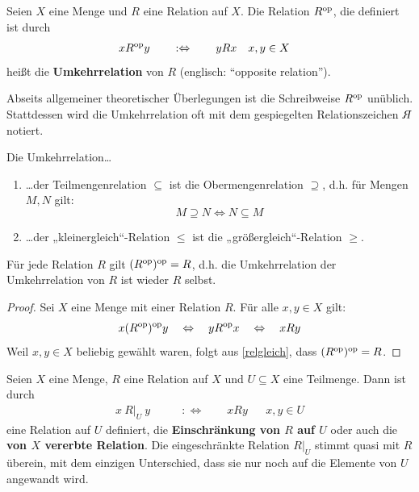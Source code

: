 \begin{defin}[Umkehrrelation] \label{def:umkehrrel} 
    Seien $X$ eine Menge und $R$ eine Relation auf $X$. Die Relation $R^{\mathrm{op}}$, die definiert ist durch
    \begin{align*}
        xR^{\mathrm{op}} y \qquad &:\Leftrightarrow\qquad yRx && x,y\in X
    \end{align*}
    heißt die \textbf{Umkehrrelation} von $R$ (englisch: ``opposite relation''). 
\end{defin}


\begin{nota} \label{spiegelrel}
    Abseits allgemeiner theoretischer Überlegungen ist die Schreibweise $R^{\mathrm{op}}$ unüblich. Stattdessen wird die Umkehrrelation oft mit dem gespiegelten Relationszeichen ${\mskip12mu\pdfsave\pdfsetmatrix{-1 0 .5 1}\makeatletter\hb@xt@\z@{$\m@th R$\hss}\makeatother\pdfrestore}$ notiert.
\end{nota}


\begin{bsp}
    Die Umkehrrelation\dots
    \begin{enumerate}
        \item \dots der Teilmengenrelation $\subseteq$ ist die Obermengenrelation $\supseteq$, d.h. für Mengen $M,N$ gilt:
            \[M\supseteq N \iff N\subseteq M \]
        \item \dots der „kleinergleich“-Relation $\le$ ist die „größergleich“-Relation $\ge$.
    \end{enumerate}
\end{bsp}


\begin{bem}[*]
    Für jede Relation $R$ gilt $(R^{\mathrm{op}})^{\mathrm{op}}=R$, d.h. die Umkehrrelation der Umkehrrelation von $R$ ist wieder $R$ selbst.
\end{bem}
\begin{proof}
    Sei $X$ eine Menge mit einer Relation $R$. Für alle $x,y\in X$ gilt:
        \[ x(R^{\mathrm{op}})^{\mathrm{op}} y \quad\Leftrightarrow\quad yR^{\mathrm{op}} x \quad\Leftrightarrow\quad xRy  \]
    Weil $x,y\in X$ beliebig gewählt waren, folgt aus \cref{relgleich}, dass $(R^{\mathrm{op}})^{\mathrm{op}} = R$.
\end{proof}


\begin{defin} \label{def:einschraenkungrelation} 
    Seien $X$ eine Menge, $R$ eine Relation auf $X$ und $U\subseteq X$ eine Teilmenge. Dann ist durch
    \begin{align*}
        x\ R\vert_U\ y \qquad& :\Leftrightarrow\qquad xRy &&x,y\in U
    \end{align*}
    eine Relation auf $U$ definiert, die \textbf{Einschränkung von $R$ auf $U$} oder auch die \textbf{von $X$ vererbte Relation}. Die eingeschränkte Relation $R\vert_U$ stimmt quasi mit $R$ überein, mit dem einzigen Unterschied, dass sie nur noch auf die Elemente von $U$ angewandt wird.
\end{defin}


